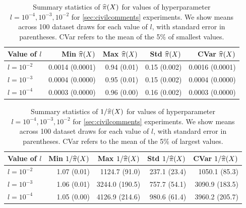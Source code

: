 \begin{table}[H]
\centering
\footnotesize
\begin{tabular}{lrrrr}
\toprule
Value of $l$ & Min $\widehat{\pi}(X)$ & Max $\widehat{\pi}(X)$ & Std $\widehat{\pi}(X)$ & CVar $\widehat{\pi}(X)$ \\
\midrule 
$l=10^{-2}$ &0.0014 (0.0001) &         0.94 (0.01) &         0.15 (0.002) &         0.0016 (0.0001)         \\
$l=10^{-3}$ &0.0004 (0.0000) &         0.95 (0.01) &         0.15 (0.002) &         0.0004 (0.0000)         \\
$l=10^{-4}$ &0.0003 (0.0000) &         0.96 (0.00) &         0.16 (0.002) &         0.0003 (0.0000)         \\
\bottomrule
\end{tabular}
\caption{Summary statistics of $\widehat{\pi}(X)$ for values of hyperparameter $l=10^{-4},10^{-3},10^{-2}$ for \cref{sec:civilcomments} experiments. We show means across 100 dataset draws for each value of $l$, with standard error in parentheses. CVar refers to the mean of the 5\% of smallest values. }
    \label{tab:civilcomments_prop}
\end{table}
\begin{table}[H]
\centering
\footnotesize
\begin{tabular}{lrrrr}
\toprule
Value of $l$ & Min $1/\widehat{\pi}(X)$ & Max $1/\widehat{\pi}(X)$ & Std $1/\widehat{\pi}(X)$ & CVar $1/\widehat{\pi}(X)$ \\
\midrule 
$l=10^{-2}$ &1.07 (0.01) &         1124.7\;\; (91.0) &         237.1 (23.4) &         1050.1 
 \; (85.3) \\
$l=10^{-3}$ &1.06 (0.01) &         3244.0 (190.5) &         757.7 (54.1) &         3090.9 (183.5) \\
$l=10^{-4}$ &1.05 (0.00) &         4126.9 (214.6) &         980.6 (61.4) &         3960.2 (205.7) \\
\bottomrule
\end{tabular}
\caption{Summary statistics of $1/\widehat{\pi}(X)$ for values of hyperparameter $l=10^{-4},10^{-3},10^{-2}$ for \cref{sec:civilcomments} experiments. We show means across 100 dataset draws for each value of $l$, with standard error in parentheses. CVar refers to the mean of the 5\% of largest values. }
    \label{tab:civilcomments_invprop}
\end{table}
